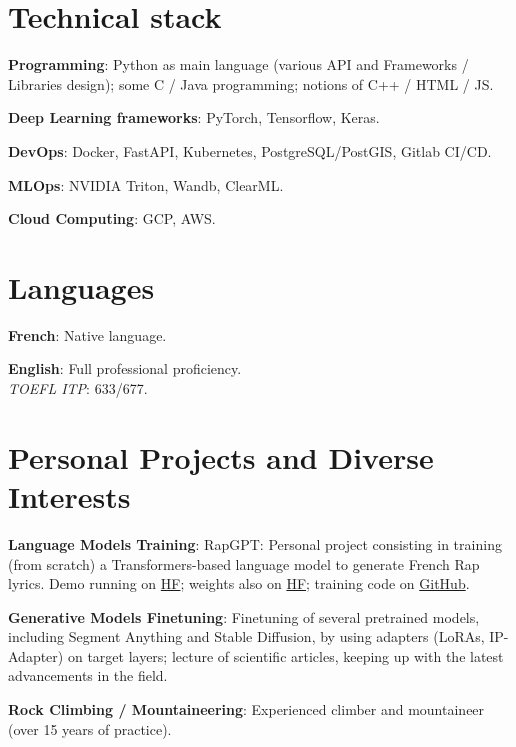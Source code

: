 \documentclass[letterpaper,10pt]{article}
\newcommand{\resumeItem}[2]{
  \item\small{
    \textbf{#1}{: #2\vspace{-0.8pt}}
  }
}
\newcommand{\resumeSubItem}[2]{
    \small{\resumeItem{#1}{#2}\vspace{-4pt}}
	}
\newcommand{\resumeSubHeadingListStart}{\begin{itemize}[leftmargin=*]}
\newcommand{\resumeSubHeadingListEnd}{\end{itemize}}
\begin{document}
\begin{minipage}[t]{0.65\linewidth}
    \section{Technical stack}
    \resumeSubHeadingListStart
    \resumeSubItem{Programming}{Python as main language (various API and Frameworks / Libraries design); some C / Java programming; notions of C++ / HTML / JS.}
    \resumeSubItem{Deep Learning frameworks}{PyTorch, Tensorflow, Keras.}
    \resumeSubItem{DevOps}{Docker, FastAPI, Kubernetes, PostgreSQL/PostGIS, Gitlab CI/CD.}
    \resumeSubItem{MLOps}{NVIDIA Triton, Wandb, ClearML.}
    \resumeSubItem{Cloud Computing}{GCP, AWS.}
    \resumeSubHeadingListEnd
\end{minipage}
\hfill
\begin{minipage}[t]{0.3\linewidth}
    \section{Languages}
    \resumeSubHeadingListStart
    \resumeSubItem{French}{Native language.}
    \resumeSubItem{English}{Full professional proficiency. \\ \emph{TOEFL ITP}: 633/677.}
    \resumeSubHeadingListEnd
\end{minipage}



\section{Personal Projects and Diverse Interests}
\vspace{0.5mm}
\begin{minipage}[t]{0.9865\textwidth}
\resumeSubHeadingListStart
\resumeSubItem{Language Models Training}{RapGPT: Personal project consisting in training (from scratch) a Transformers-based language model to generate French Rap lyrics. 
Demo running on \href{https://huggingface.co/spaces/hugojarkoff/rapGPT}{HF}; weights also on \href{https://huggingface.co/hugojarkoff/rapGPT}{HF}; training code on \href{https://github.com/hugojarkoff/rapGPT}{GitHub}.}
\resumeSubItem{Generative Models Finetuning}{Finetuning of several pretrained models, including Segment Anything and Stable Diffusion, by using adapters (LoRAs, IP-Adapter) on target layers; lecture of scientific articles, keeping up with the latest advancements in the field.}
\resumeSubItem{Rock Climbing / Mountaineering}{Experienced climber and mountaineer (over 15 years of practice).}
\resumeSubHeadingListEnd
\end{minipage}







\end{document}
